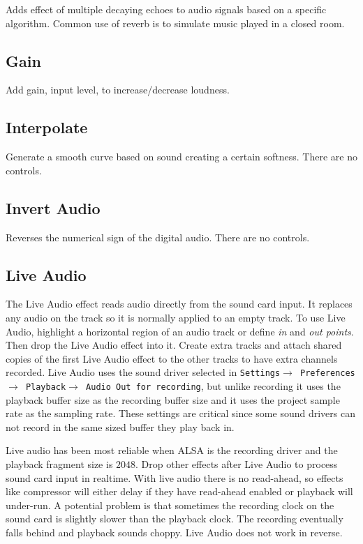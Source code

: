 Adds effect of multiple decaying echoes to audio signals based on a specific algorithm. Common use of reverb is to simulate music played in a closed room.

\subsection{Gain}%
\label{sub:gain}

Add gain, input level, to increase/decrease loudness.

\subsection{Interpolate}%
\label{sub:interpolate}

Generate a smooth curve based on sound creating a certain softness. There are no controls.

\subsection{Invert Audio}%
\label{sub:invert_audio}

Reverses the numerical sign of the digital audio. There are no controls.

\subsection{Live Audio}%
\label{sub:live_audio}

The Live Audio effect reads audio directly from the sound card input. It replaces any audio on the track so it is normally applied to an empty track. To use Live Audio, highlight a horizontal region of an audio track or define \textit{in} and \textit{out points}. Then drop the Live Audio effect into it. Create extra tracks and attach shared copies of the first Live Audio effect to the other tracks to have extra channels recorded. Live Audio uses the sound driver selected in \texttt{Settings$\rightarrow$ Preferences$\rightarrow$ Playback$\rightarrow$ Audio Out for recording}, but unlike recording it uses the playback buffer size as the recording buffer size and it uses the project sample rate as the sampling rate. These settings are critical since some sound drivers can not record in the same sized buffer they play back in. 

Live audio has been most reliable when ALSA is the recording driver and the playback fragment size is $2048$. Drop other effects after Live Audio to process sound card input in realtime. With live audio there is no read-ahead, so effects like compressor will either delay if they have read-ahead enabled or playback will under-run. A potential problem is that sometimes the recording clock on the sound card is slightly slower than the playback clock. The recording eventually falls behind and playback sounds choppy. Live Audio does not work in reverse.

